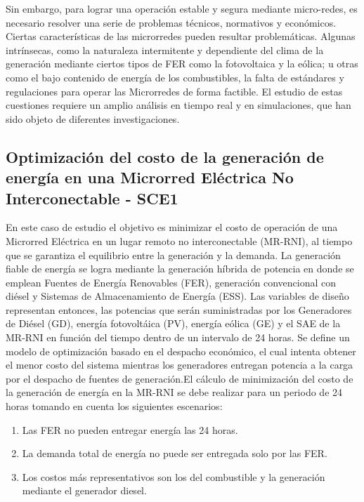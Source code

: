 Sin embargo, para lograr una operación estable y segura mediante micro-redes, es necesario resolver una serie de problemas técnicos, normativos y económicos. Ciertas características de las microrredes pueden resultar problemáticas. Algunas intrínsecas, como la naturaleza intermitente y dependiente del clima de la generación mediante ciertos tipos de FER como la fotovoltaica y la eólica; u otras como el bajo contenido de energía de los combustibles, la falta de estándares y regulaciones para operar las Microrredes de forma factible. El estudio de estas cuestiones requiere un amplio análisis en tiempo real y en simulaciones, que han sido objeto de diferentes investigaciones.

 \subsection{Optimización del costo de la generación de energía en una Microrred Eléctrica No Interconectable - SCE1}
En este caso de estudio el objetivo es minimizar el costo de operación de una  Microrred Eléctrica en un lugar remoto no interconectable (MR-RNI), al tiempo que se garantiza el equilibrio entre la generación y la demanda. La generación fiable de energía se logra mediante la generación híbrida de potencia en donde se emplean Fuentes de Energía Renovables (FER), generación convencional con diésel y Sistemas de Almacenamiento de Energía (ESS). Las variables de diseño representan entonces, las potencias que serán suministradas por los Generadores de Diésel (GD), energía fotovoltáica (PV), energía eólica (GE) y el SAE de la MR-RNI en función del tiempo dentro de un intervalo de 24 horas. Se define un modelo de optimización basado en el despacho económico, el cual intenta obtener el menor costo del sistema mientras los generadores entregan potencia a la carga por el despacho de fuentes de generación.El cálculo de minimización del costo de la generación de energía en la MR-RNI se debe realizar para un periodo de 24 horas tomando en cuenta los siguientes escenarios\cite{zapata_zapata_control_2017}: 
\begin{enumerate}
\item Las FER no pueden entregar energía las 24 horas.
\item La demanda total de energía no puede ser entregada solo por las FER.
\item Los costos más representativos son los del combustible y la generación mediante el generador diesel.
\end{enumerate}
